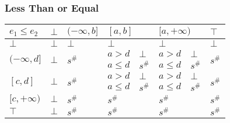 \documentclass{beamer}
\begin{document}
    
        \begin{frame}
            \frametitle{Less Than or Equal}
    \begin{table}[]
        \begin{tabular}{|l|l|l|ll|ll|l|}
        \hline
        $e_1 \le e_2$                   & $\bot$                  & $(-\infty, b]$          & \multicolumn{2}{l|}{$[a, b]$} & \multicolumn{2}{l|}{$[a, +\infty)$} & $\top$                  \\ \hline
        $\bot$                          & $\bot$                  & $\bot$                  & \multicolumn{2}{l|}{$\bot$}   & \multicolumn{2}{l|}{$\bot$}         & $\bot$                  \\ \hline
        \multirow{2}{*}{$(-\infty, d]$} & \multirow{2}{*}{$\bot$} & \multirow{2}{*}{$s^\#$} & $a > d$         & $\bot$      & $a > d$            & $\bot$         & \multirow{2}{*}{$s^\#$} \\
                                        &                         &                         & $a \le d$       & $s^\#$      & $a \le d$          & $s^\#$         &                         \\ \hline
        \multirow{2}{*}{$[c, d]$}       & \multirow{2}{*}{$\bot$} & \multirow{2}{*}{$s^\#$} & $a > d$         & $\bot$      & $a > d$            & $\bot$         & \multirow{2}{*}{$s^\#$} \\
                                        &                         &                         & $a \le d$       & $s^\#$      & $a \le d$          & $s^\#$         &                         \\ \hline
        $[c, +\infty)$                  & $\bot$                  & $s^\#$                  & \multicolumn{2}{l|}{$s^\#$}   & \multicolumn{2}{l|}{$s^\#$}         & $s^\#$                  \\ \hline
        $\top$                          & $\bot$                  & $s^\#$                  & \multicolumn{2}{l|}{$s^\#$}   & \multicolumn{2}{l|}{$s^\#$}         & $s^\#$                  \\ \hline
        \end{tabular}
        \end{table}
    \end{frame}
    
\end{document}

